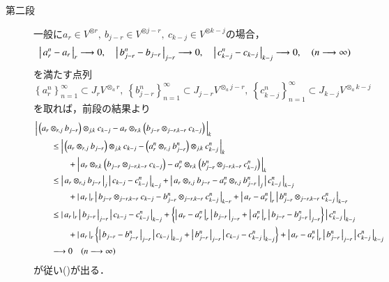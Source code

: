 \begin{prf}
\begin{description}
			\item[第二段]
				一般に$a_r \in V^{\otimes r},\ b_{j-r} \in V^{\otimes j-r},
				\ c_{k-j} \in V^{\otimes k-j}$の場合，
				\begin{align}
					\left|\, a_r^n - a_r\, \right|_{r} \longrightarrow 0,
					\quad \left|\, b_{j-r}^n - b_{j-r}\, \right|_{j-r} \longrightarrow 0,
					\quad \left|\, c_{k-j}^n - c_{k-j}\, \right|_{k-j} \longrightarrow 0,
					\quad (n \longrightarrow \infty)
				\end{align}
				を満たす点列$\left\{ a_r^n \right\}_{n=1}^\infty \subset J_r V^{\otimes_a r},\ 
				\left\{ b_{j-r}^n \right\}_{n=1}^\infty \subset J_{j-r} V^{\otimes_a j-r},\ 
				\left\{ c_{k-j}^n \right\}_{n=1}^\infty \subset J_{k-j} V^{\otimes_a k-j}$
				を取れば，前段の結果より
				\begin{align}
					&\left|\, \left( a_r \otimes_{r,j} b_{j-r} \right) \otimes_{j,k} c_{k-j}
					- a_r \otimes_{r,k} \left( b_{j-r} \otimes_{j-r,k-r} c_{k-j} \right)\, \right|_{k} \\
					&\qquad \leq \left|\, \left( a_r \otimes_{r,j} b_{j-r} \right) \otimes_{j,k} c_{k-j} - \left( a^n_r \otimes_{r,j} b^n_{j-r} \right) \otimes_{j,k} c^n_{k-j}\, \right|_{k} \\
					&\qquad\qquad + \left|\, a_r \otimes_{r,k} \left( b_{j-r} \otimes_{j-r,k-r} c_{k-j} \right) - a^n_r \otimes_{r,k} \left( b^n_{j-r} \otimes_{j-r,k-r} c^n_{k-j} \right)\, \right|_{k} \\
					&\qquad \leq \left|\, a_r \otimes_{r,j} b_{j-r}\, \right|_{j} \left|\, c_{k-j} - c^n_{k-j}\, \right|_{k-j} 
						+ \left|\, a_r \otimes_{r,j} b_{j-r} - a^n_r \otimes_{r,j} b^n_{j-r}\, \right|_{j} \left|\, c^n_{k-j}\, \right|_{k-j} \\
					&\qquad\qquad + \left|\, a_r\, \right|_{r} \left|\, b_{j-r} \otimes_{j-r,k-r} c_{k-j} - b^n_{j-r} \otimes_{j-r,k-r} c^n_{k-j}\, \right|_{k-r}
						+ \left|\, a_r - a_r^n\, \right|_{r} \left|\, b^n_{j-r} \otimes_{j-r,k-r} c^n_{k-j}\, \right|_{k-r} \\
					&\qquad \leq \left|\, a_r\, \right|_{r} \left|\, b_{j-r}\, \right|_{j-r} \left|\, c_{k-j} - c^n_{k-j}\, \right|_{k-j} 
						+ \left\{ \left|\, a_r-a^n_r\, \right|_{r} \left|\, b_{j-r}\, \right|_{j-r} 
						+ \left|\, a^n_r\, \right|_{r} \left|\, b_{j-r} - b^n_{j-r}\, \right|_{j-r} \right\} \left|\, c^n_{k-j}\, \right|_{k-j} \\
					&\qquad\qquad + \left|\, a_r\, \right|_{r} 
						\left\{ \left|\, b_{j-r} - b^n_{j-r}\, \right|_{j-r} \left|\, c_{k-j}\, \right|_{k-j} 
						+ \left|\, b^n_{j-r}\, \right|_{j-r} \left|\, c_{k-j}-c^n_{k-j}\, \right|_{k-j} \right\}
						+ \left|\, a_r - a_r^n\, \right|_{r} \left|\, b^n_{j-r}\, \right|_{j-r} \left|\, c^n_{k-j}\, \right|_{k-j} \\
					&\qquad \longrightarrow 0
					\quad (n \longrightarrow \infty) 
				\end{align}
				が従い()が出る．
				\QED
		\end{description}	
	\end{prf}
	
